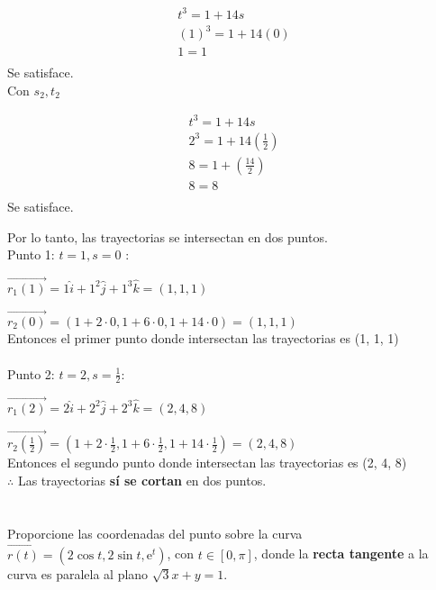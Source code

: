 \documentclass[12pt]{article}
\begin{document}
\begin{align*}
  t^3 =  1+14s \\
  (1)^3 =  1+14(0)  \\
  1 =  1  \\
\end{align*}
Se satisface. \\
Con $s_2, t_2$

\begin{align*}
  t^3 =  1+14s \\
  2^3 =  1+14 \left( \frac{1}{2} \right) \\
  8  =  1 + \left(\frac{14}{2} \right) \\
   8  =  8 \\
\end{align*}
Se satisface.

Por lo tanto, las trayectorias se intersectan en dos puntos.\\
Punto 1: $t=1 , s=0$ :
\item $\vec{r_1(1)}=1\hat{i}+1^2\hat{j}+1^3\hat{k} = (1, 1, 1) $

\item $\vec{r_2(0)}=(1+2 \cdot 0,1+6 \cdot 0,1+14 \cdot 0) = (1, 1, 1) $\\
  Entonces el primer punto donde intersectan las trayectorias es (1, 1, 1) \\ \\
 Punto 2: $t=2 , s=\frac{1}{2}$:
  \item $\vec{r_1(2)}=2\hat{i}+2^2\hat{j}+2^3\hat{k} = (2, 4, 8) $

\item $\vec{r_2(\frac{1}{2})}=(1+2 \cdot \frac{1}{2} ,1+6 \cdot \frac{1}{2},1+14 \cdot \frac{1}{2}) = (2, 4, 8) $\\
  Entonces el segundo punto donde intersectan las trayectorias es (2, 4, 8) \\
$ \therefore $ Las trayectorias \textbf{sí se cortan} en dos puntos.
\section{}
Proporcione las coordenadas del punto sobre la curva $\vec{r(t)}=(2\cos{t},2\sin{t},\mathrm{e}^t)$, con $t \in [0,\pi]$, donde la \textbf{recta tangente} a la curva es paralela al plano $\sqrt{3}x+y=1$.

\end{document}
